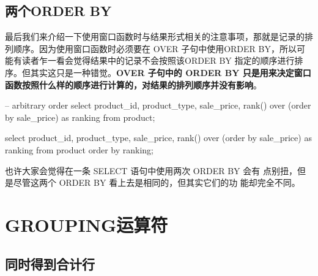 \subsection{两个ORDER BY}
最后我们来介绍一下使用窗口函数时与结果形式相关的注意事项，那就是记录的排列顺序。因为使用窗口函数时必须要在 OVER 子句中使用ORDER BY，所以可能有读者乍一看会觉得结果中的记录不会按照该ORDER BY 指定的顺序进行排序。但其实这只是一种错觉。\textbf{OVER 子句中的 ORDER BY 只是用来决定窗口函数按照什么样的顺序进行计算的，对结果的排列顺序并没有影响}。

\begin{sqlc}
-- arbitrary order
select product_id, product_type, sale_price,
	rank() over (order by sale_price) as ranking
	from product;

select product_id, product_type, sale_price,
	rank() over (order by sale_price) as ranking
	from product
	order by ranking;
\end{sqlc}

也许大家会觉得在一条 SELECT 语句中使用两次 ORDER BY 会有
点别扭，但是尽管这两个 ORDER BY 看上去是相同的，但其实它们的功
能却完全不同。
\section{GROUPING运算符}
\subsection{同时得到合计行}

